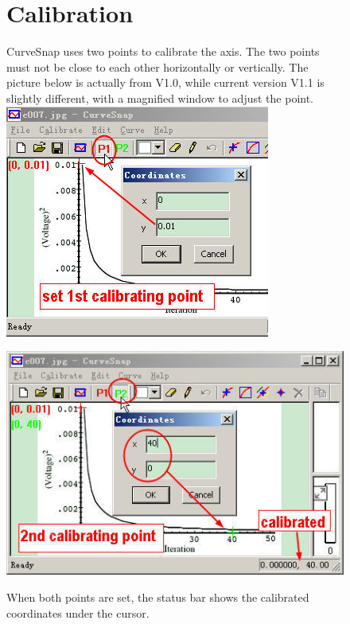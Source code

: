 \documentclass[12pt]{article}
\begin{document}
\begin{figure}[ht!]
\section{Calibration}
  CurveSnap uses two points to calibrate the axis. The two points must not be close to each other horizontally or vertically. The picture below is actually from V1.0, while current version V1.1 is slightly different, with a magnified window to adjust the point.
  \center \includegraphics{./tut_files/07_1st_calibrating_point.jpg}
\end{figure}
\begin{figure}[ht!]
  \center \includegraphics{./tut_files/08_2nd_calibrating_point.jpg}

  When both points are set, the status bar shows the calibrated coordinates under the cursor.
\end{figure}
\end{document}
